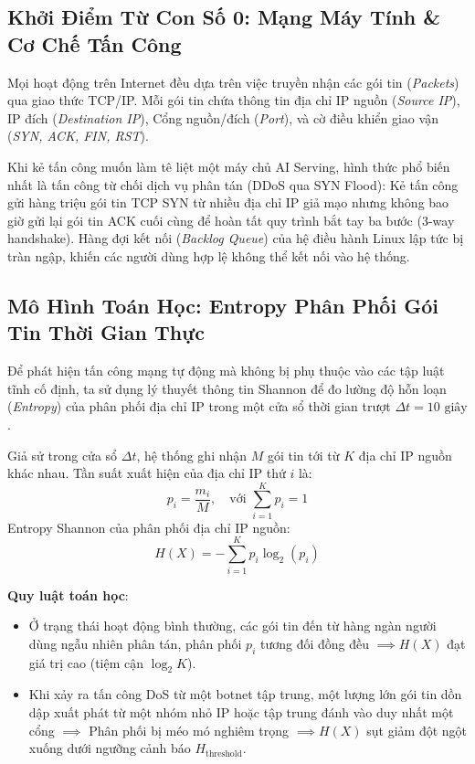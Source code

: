 \subsection{Khởi Điểm Từ Con Số 0: Mạng Máy Tính \& Cơ Chế Tấn Công}
Mọi hoạt động trên Internet đều dựa trên việc truyền nhận các gói tin (\textit{Packets}) qua giao thức TCP/IP. Mỗi gói tin chứa thông tin địa chỉ IP nguồn (\textit{Source IP}), IP đích (\textit{Destination IP}), Cổng nguồn/đích (\textit{Port}), và cờ điều khiển giao vận (\textit{SYN, ACK, FIN, RST}).

Khi kẻ tấn công muốn làm tê liệt một máy chủ AI Serving, hình thức phổ biến nhất là tấn công từ chối dịch vụ phân tán (DDoS qua SYN Flood): Kẻ tấn công gửi hàng triệu gói tin TCP SYN từ nhiều địa chỉ IP giả mạo nhưng không bao giờ gửi lại gói tin ACK cuối cùng để hoàn tất quy trình bắt tay ba bước (3-way handshake). Hàng đợi kết nối (\textit{Backlog Queue}) của hệ điều hành Linux lập tức bị tràn ngập, khiến các người dùng hợp lệ không thể kết nối vào hệ thống.

\subsection{Mô Hình Toán Học: Entropy Phân Phối Gói Tin Thời Gian Thực}
Để phát hiện tấn công mạng tự động mà không bị phụ thuộc vào các tập luật tĩnh cố định, ta sử dụng lý thuyết thông tin Shannon để đo lường độ hỗn loạn (\textit{Entropy}) của phân phối địa chỉ IP trong một cửa sổ thời gian trượt $\Delta t = 10\text{ giây}$.

Giả sử trong cửa sổ $\Delta t$, hệ thống ghi nhận $M$ gói tin tới từ $K$ địa chỉ IP nguồn khác nhau. Tần suất xuất hiện của địa chỉ IP thứ $i$ là:
\begin{equation}
p_i = \frac{m_i}{M}, \quad \text{với } \sum_{i=1}^K p_i = 1
\end{equation}
Entropy Shannon của phân phối địa chỉ IP nguồn:
\begin{equation}
H(X) = - \sum_{i=1}^K p_i \log_2(p_i)
\end{equation}

\textbf{Quy luật toán học}:
\begin{itemize}
  \item Ở trạng thái hoạt động bình thường, các gói tin đến từ hàng ngàn người dùng ngẫu nhiên phân tán, phân phối $p_i$ tương đối đồng đều $\implies H(X)$ đạt giá trị cao (tiệm cận $\log_2 K$).
  \item Khi xảy ra tấn công DoS từ một botnet tập trung, một lượng lớn gói tin dồn dập xuất phát từ một nhóm nhỏ IP hoặc tập trung đánh vào duy nhất một cổng $\implies$ Phân phối bị méo mó nghiêm trọng $\implies H(X)$ sụt giảm đột ngột xuống dưới ngưỡng cảnh báo $H_{\text{threshold}}$.
\end{itemize}

